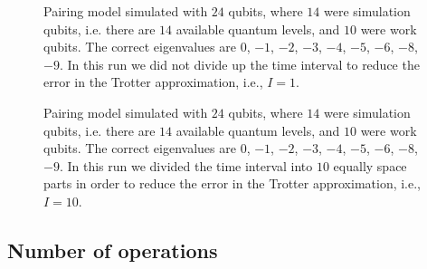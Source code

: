 \documentclass[aps,pra,twocolumn,floatfix]{revtex4}
\begin{document}
\begin{figure}[h!]
\begin{center}
	\caption{Pairing model simulated with $24$ qubits, where $14$
          were simulation qubits, i.e. there are $14$ available
          quantum levels,  and
          $10$ were work qubits.  The correct eigenvalues are $0$, $-1$,
          $-2$,  $-3$, $-4$, $-5$, $-6$, $-8$, $ -9$. In this run we
          did not divide up the time interval to reduce the error in
          the Trotter approximation, i.e., $I=1$.}
	\label{fig:P24-15-1IM}
\end{center} 
\end{figure}

\begin{figure}[h!]
\begin{center}
	\caption{Pairing model simulated with $24$ qubits, where $14$
          were simulation qubits, i.e. there are $14$ available
          quantum levels,  and
          $10$ were work qubits.
          The correct eigenvalues are $0$, $-1$,
          $-2$,  $-3$, $-4$, $-5$, $-6$, $-8$, $ -9$. In this run we
          divided the time interval into $10$ equally space parts
          in order to reduce the error in
          the Trotter approximation, i.e., $I=10$.}
	\label{fig:P24-15-e1IM}
\end{center} 
\end{figure}


\subsection{Number of operations}
\end{document}
